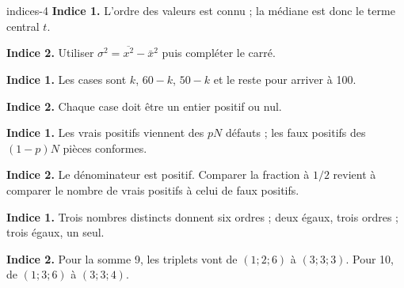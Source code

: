 \begin{blocEdition}{indices-4}
\textbf{Indice 1.} L’ordre des valeurs est connu ; la médiane est donc le terme central $t$.\par\smallskip
\textbf{Indice 2.} Utiliser $\sigma^2=\overline{x^2}-\bar x^2$ puis compléter le carré.\par
{}
\textbf{Indice 1.} Les cases sont $k$, $60-k$, $50-k$ et le reste pour arriver à 100.\par\smallskip
\textbf{Indice 2.} Chaque case doit être un entier positif ou nul.\par
{}
\textbf{Indice 1.} Les vrais positifs viennent des $pN$ défauts ; les faux positifs des $(1-p)N$ pièces conformes.\par\smallskip
\textbf{Indice 2.} Le dénominateur est positif. Comparer la fraction à $1/2$ revient à comparer le nombre de vrais positifs à celui de faux positifs.\par
{}
\textbf{Indice 1.} Trois nombres distincts donnent six ordres ; deux égaux, trois ordres ; trois égaux, un seul.\par\smallskip
\textbf{Indice 2.} Pour la somme 9, les triplets vont de $(1;2;6)$ à $(3;3;3)$. Pour 10, de $(1;3;6)$ à $(3;3;4)$.\par

\end{blocEdition}
